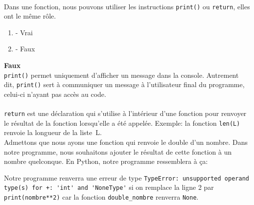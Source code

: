 \begin{Exercice}[2 minutes]\\
Dans une fonction, nous pouvons utiliser les instructions \lstinline{print()} ou \lstinline{return}, elles ont le même rôle.
\begin{enumerate}
    \item - Vrai
    \item - Faux
\end{enumerate}
\begin{solution}
    \textbf{Faux}\\
    \lstinline{print()} permet uniquement d'afficher un message dans la console. Autrement dit, \lstinline{print()} sert à communiquer un message à l'utilisateur final du programme, celui-ci n'ayant pas accès au code.\\\\
    \lstinline{return} est une déclaration qui s'utilise à l'intérieur d'une fonction pour renvoyer le résultat de la fonction lorsqu'elle a été appelée. Exemple: la fonction \lstinline{len(L)} renvoie la longueur de la liste~L.\\

    Admettons que nous ayons une fonction qui renvoie le double d'un nombre. Dans notre programme, nous souhaitons ajouter le résultat de cette fonction à un nombre quelconque.
    En Python, notre programme ressemblera à ça:
    

    Notre programme renverra une erreur de type \lstinline{TypeError: unsupported operand type(s) for +: 'int' and 'NoneType'} si on remplace la ligne 2 par \lstinline{print(nombre**2)} car la fonction \lstinline{double_nombre} renverra \lstinline{None}.
\end{solution}
\end{Exercice}


